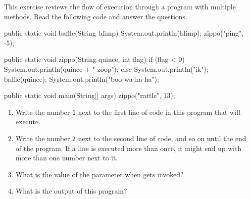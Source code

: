 \begin{exercise}  %

This exercise reviews the flow of execution through a program with multiple methods.
Read the following code and answer the questions.

\begin{code}
public static void baffle(String blimp) {
    System.out.println(blimp);
    zippo("ping", -5);
}
\end{code}

\begin{code}
public static void zippo(String quince, int flag) {
    if (flag < 0) {
        System.out.println(quince + " zoop");
    } else {
        System.out.println("ik");
        baffle(quince);
        System.out.println("boo-wa-ha-ha");
    }
}
\end{code}

\begin{code}
public static void main(String[] args) {
    zippo("rattle", 13);
}
\end{code}

\begin{enumerate}

\item Write the number {\tt 1} next to the first line of code in this program that will execute.

\item Write the number {\tt 2} next to the second line of code, and so on until the end of the program.
If a line is executed more than once, it might end up with more than one number next to it.

\item What is the value of the parameter  when  gets invoked?

\item What is the output of this program?

\end{enumerate}

\end{exercise}


